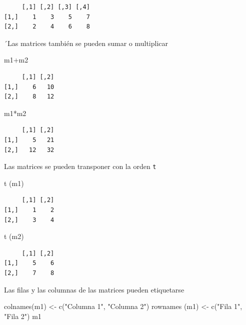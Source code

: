 \documentclass[
  letterpaper,
  DIV=11,
  numbers=noendperiod]{scrreprt}
\newenvironment{Shaded}{\begin{snugshade}}{\end{snugshade}}
\newcommand{\FunctionTok}[1]{\textcolor[rgb]{0.28,0.35,0.67}{#1}}
\newcommand{\NormalTok}[1]{\textcolor[rgb]{0.00,0.23,0.31}{#1}}
\newcommand{\OtherTok}[1]{\textcolor[rgb]{0.00,0.23,0.31}{#1}}
\newcommand{\SpecialCharTok}[1]{\textcolor[rgb]{0.37,0.37,0.37}{#1}}
\newcommand{\StringTok}[1]{\textcolor[rgb]{0.13,0.47,0.30}{#1}}
\begin{document}
\begin{verbatim}
     [,1] [,2] [,3] [,4]
[1,]    1    3    5    7
[2,]    2    4    6    8
\end{verbatim}

´Las matrices también se pueden sumar o multiplicar

\begin{Shaded}
\begin{Highlighting}[]
\NormalTok{m1}\SpecialCharTok{+}\NormalTok{m2}
\end{Highlighting}
\end{Shaded}

\begin{verbatim}
     [,1] [,2]
[1,]    6   10
[2,]    8   12
\end{verbatim}

\begin{Shaded}
\begin{Highlighting}[]
\NormalTok{m1}\SpecialCharTok{*}\NormalTok{m2}
\end{Highlighting}
\end{Shaded}

\begin{verbatim}
     [,1] [,2]
[1,]    5   21
[2,]   12   32
\end{verbatim}

Las matrices se pueden transponer con la orden \texttt{t}

\begin{Shaded}
\begin{Highlighting}[]
\FunctionTok{t}\NormalTok{ (m1)}
\end{Highlighting}
\end{Shaded}

\begin{verbatim}
     [,1] [,2]
[1,]    1    2
[2,]    3    4
\end{verbatim}

\begin{Shaded}
\begin{Highlighting}[]
\FunctionTok{t}\NormalTok{ (m2)}
\end{Highlighting}
\end{Shaded}

\begin{verbatim}
     [,1] [,2]
[1,]    5    6
[2,]    7    8
\end{verbatim}

Las filas y las columnas de las matrices pueden etiquetarse

\begin{Shaded}
\begin{Highlighting}[]
\FunctionTok{colnames}\NormalTok{(m1) }\OtherTok{\textless{}{-}} \FunctionTok{c}\NormalTok{(}\StringTok{"Columna 1"}\NormalTok{, }\StringTok{"Columna 2"}\NormalTok{)}
\FunctionTok{rownames}\NormalTok{ (m1) }\OtherTok{\textless{}{-}} \FunctionTok{c}\NormalTok{(}\StringTok{"Fila 1"}\NormalTok{, }\StringTok{"Fila 2"}\NormalTok{)}
\NormalTok{m1}
\end{Highlighting}
\end{Shaded}
\end{document}
